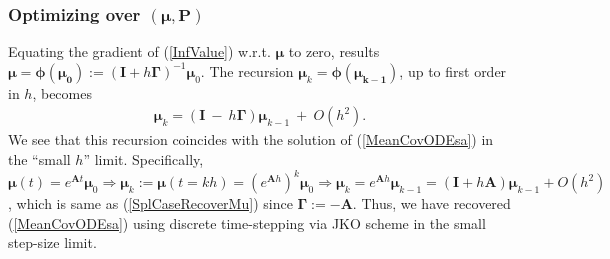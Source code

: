 \documentclass[letterpaper,10pt,twocolumn,conference]{ieeeconf}
\begin{document}
\subsubsection{Optimizing over $(\bm{\mu},\bm{P})$}
Equating the gradient of (\ref{InfValue}) w.r.t. $\bm{\mu}$ to zero, results $\bm{\mu} = \bm{\phi}(\bm{\mu_{0}}) := (\bm{I}+h\bm{\Gamma})^{-1}\bm{\mu}_{0}$. The recursion $\bm{\mu}_{k} = \bm{\phi}(\bm{\mu_{k-1}})$, up to first order in $h$, becomes
\begin{eqnarray}
\bm{\mu}_{k} = \left(\bm{I} \:-\: h\bm{\Gamma}\right)\bm{\mu}_{k-1} \: + \: O(h^{2}).
\label{SplCaseRecoverMu}	
\end{eqnarray}
We see that this recursion coincides with the solution of  (\ref{MeanCovODEsa}) in the ``small $h$'' limit. Specifically, 
 $\bm{\mu}(t)=e^{\bm{A}t}\bm{\mu}_{0} \Rightarrow \bm{\mu}_{k} := \bm{\mu}(t=kh) = \left(e^{\bm{A}h}\right)^{k}\bm{\mu}_{0} \Rightarrow \bm{\mu}_{k} = e^{\bm{A}h} \bm{\mu}_{k-1} = \left(\bm{I} + h\bm{A}\right)\bm{\mu}_{k-1} + O(h^{2})$, which is same as (\ref{SplCaseRecoverMu}) since $\bm{\Gamma} := -\bm{A}$. Thus, we have recovered (\ref{MeanCovODEsa}) using discrete time-stepping via JKO scheme in the small step-size limit.
\end{document}
